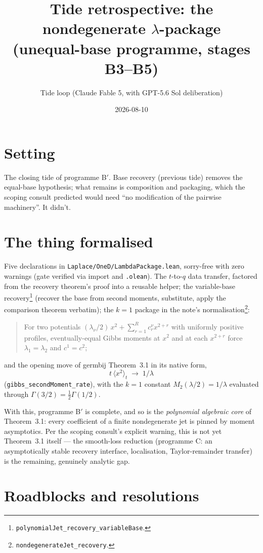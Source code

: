 \documentclass[11pt]{article}
\title{Tide retrospective: the nondegenerate $\lambda$-package\\
(unequal-base programme, stages B3--B5)}
\author{Tide loop (Claude Fable 5, with GPT-5.6 Sol deliberation)}
\date{2026-08-10}
\begin{document}
\maketitle

\section{Setting}

The closing tide of programme B$'$. Base recovery (previous tide)
removes the equal-base hypothesis; what remains is composition and
packaging, which the scoping consult predicted would need ``no
modification of the pairwise machinery''. It didn't.

\section{The thing formalised}

Five declarations in \texttt{Laplace/OneD/LambdaPackage.lean},
sorry-free with zero warnings (gate verified via import and
\texttt{.olean}). The $t$-to-$q$ data transfer, factored from the
recovery theorem's proof into a reusable helper; the variable-base
recovery\footnote{\texttt{polynomialJet\_recovery\_variableBase}.}
(recover the base from second moments, substitute, apply the
comparison theorem verbatim); the $k = 1$ package in the note's
normalisation\footnote{\texttt{nondegenerateJet\_recovery}.}:
\begin{quote}
For two potentials $(\lambda_\nu/2)\,x^2 + \sum_{r=1}^R c^\nu_r
x^{2+r}$ with uniformly positive profiles, eventually-equal Gibbs
moments at $x^2$ and at each $x^{2+r}$ force $\lambda_1 = \lambda_2$
and $c^1 = c^2$;
\end{quote}
and the opening move of germbij Theorem~3.1 in its native form,
\[
t\,\langle x^2\rangle_t \;\longrightarrow\; 1/\lambda
\]
(\texttt{gibbs\_secondMoment\_rate}), with the $k = 1$ constant
$M_2(\lambda/2) = 1/\lambda$ evaluated through
$\Gamma(3/2) = \tfrac12\Gamma(1/2)$.

With this, programme B$'$ is complete, and so is the \emph{polynomial
algebraic core} of Theorem~3.1: every coefficient of a finite
nondegenerate jet is pinned by moment asymptotics. Per the scoping
consult's explicit warning, this is not yet Theorem~3.1 itself ---
the smooth-loss reduction (programme C: an asymptotically stable
recovery interface, localisation, Taylor-remainder transfer) is the
remaining, genuinely analytic gap.

\section{Roadblocks and resolutions}
\end{document}
